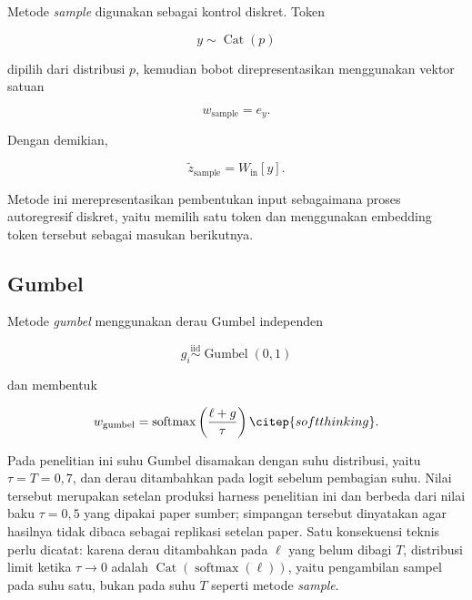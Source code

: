 Metode \textit{sample} digunakan sebagai kontrol diskret. Token

\begin{equation}
y\sim\operatorname{Cat}(p)
\end{equation}

dipilih dari distribusi \(p\), kemudian bobot direpresentasikan menggunakan vektor satuan

\begin{equation}
w_{\mathrm{sample}}=e_y.
\end{equation}

Dengan demikian,

\begin{equation}
\tilde z_{\mathrm{sample}}
=
W_{\mathrm{in}}[y].
\end{equation}

Metode ini merepresentasikan pembentukan input sebagaimana proses autoregresif diskret, yaitu memilih satu token dan menggunakan embedding token tersebut sebagai masukan berikutnya.

\subsection{Gumbel}

Metode \textit{gumbel} menggunakan derau Gumbel independen

\begin{equation}
g_i\overset{\mathrm{iid}}{\sim}
\operatorname{Gumbel}(0,1)
\end{equation}

dan membentuk

\begin{equation}
w_{\mathrm{gumbel}}
=
\operatorname{softmax}
\left(
\frac{\ell+g}{\tau}
\right) \citep{softthinking}.
\end{equation}

Pada penelitian ini suhu Gumbel disamakan dengan suhu distribusi, yaitu
\(\tau=T=0{,}7\), dan derau ditambahkan pada logit sebelum pembagian suhu.
Nilai tersebut merupakan setelan produksi harness penelitian ini dan berbeda
dari nilai baku \(\tau=0{,}5\) yang dipakai paper sumber; simpangan tersebut
dinyatakan agar hasilnya tidak dibaca sebagai replikasi setelan paper. Satu
konsekuensi teknis perlu dicatat: karena derau ditambahkan pada \(\ell\) yang
belum dibagi \(T\), distribusi limit ketika \(\tau\rightarrow0\) adalah
\(\operatorname{Cat}(\operatorname{softmax}(\ell))\), yaitu pengambilan sampel
pada suhu satu, bukan pada suhu \(T\) seperti metode \textit{sample}.

